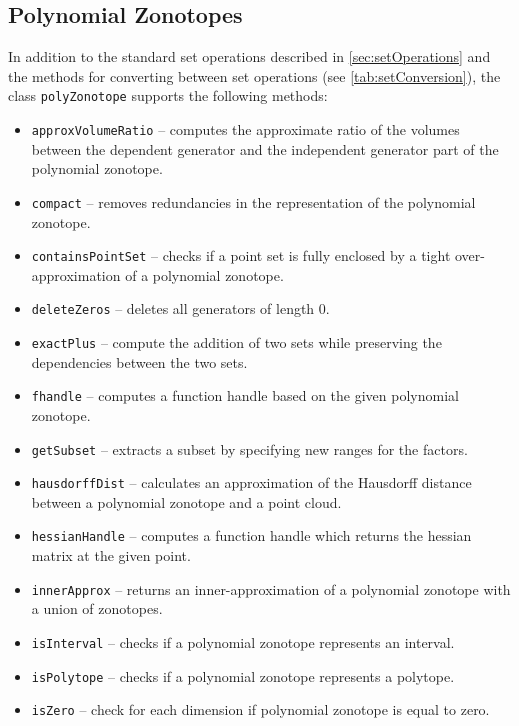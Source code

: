 
\subsection{Polynomial Zonotopes}    \label{sec:polyZonotopeOperations}

In addition to the standard set operations described in \cref{sec:setOperations} and the methods for converting between set operations (see \cref{tab:setConversion}), the class \texttt{polyZonotope} supports the following methods:

\begin{itemize}
    \item \texttt{approxVolumeRatio} -- computes the approximate ratio of the volumes between the dependent generator and the independent generator part of the polynomial zonotope.
    \item \texttt{compact} -- removes redundancies in the representation of the polynomial zonotope.
    \item \texttt{containsPointSet} -- checks if a point set is fully enclosed by a tight over-approximation of a polynomial zonotope.
    \item \texttt{deleteZeros} -- deletes all generators of length 0.
    \item \texttt{exactPlus} -- compute the addition of two sets while preserving the dependencies between the two sets.
    \item \texttt{fhandle} -- computes a function handle based on the given polynomial zonotope.
    \item \texttt{getSubset} -- extracts a subset by specifying new ranges for the factors.
    \item \texttt{hausdorffDist} -- calculates an approximation of the Hausdorff distance between a polynomial zonotope and a point cloud.
    \item \texttt{hessianHandle} -- computes a function handle which returns the hessian matrix at the given point.
    \item \texttt{innerApprox} -- returns an inner-approximation of a polynomial zonotope with a union of zonotopes.
    \item \texttt{isInterval} -- checks if a polynomial zonotope represents an interval.
    \item \texttt{isPolytope} -- checks if a polynomial zonotope represents a polytope.
    \item \texttt{isZero} -- check for each dimension if polynomial zonotope is equal to zero.

\end{itemize}

